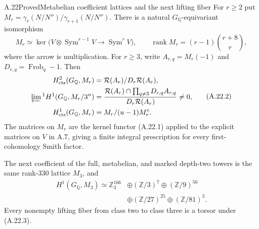 \begin{statement}{A.22}{Proved}{Metabelian coefficient lattices and the next lifting fiber}
For $r\ge2$ put $M_r=\gamma_r(N/N'')/\gamma_{r+1}(N/N'')$.
There is a natural $G_{\mathbb Q}$-equivariant isomorphism
\[
 M_r\simeq\ker\bigl(V\otimes\operatorname{Sym}^{r-1}V
             \longrightarrow\operatorname{Sym}^rV\bigr),\qquad
 \operatorname{rank}M_r=(r-1)\binom{r+8}{r},             \tag{A.22.1}
\]
where the arrow is multiplication. For $r\ge3$, write
$A_{r,q}=M_r(-1)$ and $D_{r,q}=\operatorname{Frob}_q-1$.
Then
\[
\begin{split}
 H^2_{\mathrm{cts}}(G_{\mathbb Q},M_r)
   &=\mathcal R(A_r)/D_r\mathcal R(A_r),\\
 \varprojlim{}^1H^1(G_{\mathbb Q},M_r/3^n)
   &=\frac{\mathcal R(A_r)\cap\prod_{q\ne3}D_{r,q}A_{r,q}}
           {D_r\mathcal R(A_r)}\ne0,\\
 H^1_{\mathrm{cts}}(G_{\mathbb Q},M_r)
   &=M_r/(u-1)M_r^c.
\end{split}
\tag{A.22.2}
\]
The matrices on $M_r$ are the kernel functor (A.22.1) applied
to the explicit matrices on $V$ in A.7, giving a finite integral
prescription for every first-cohomology Smith factor.

The next coefficient of the full, metabelian, and marked
depth-two towers is the same rank-$330$ lattice $M_3$, and
\[
\begin{split}
 H^1(G_{\mathbb Q},M_3)\simeq\mathbb Z_3^{166}
 &\oplus(\mathbb Z/3)^7\oplus(\mathbb Z/9)^{56}\\
 &\oplus(\mathbb Z/27)^{25}\oplus(\mathbb Z/81)^3.
\end{split}
\tag{A.22.3}
\]
Every nonempty lifting fiber from class two to class three is
a torsor under (A.22.3).
\end{statement}
